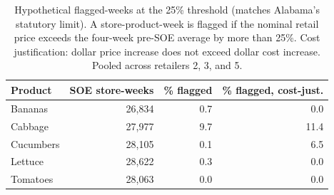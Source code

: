 \begin{table}[!h]
\centering
\caption{\label{tab:tab:flagged_weeks_T25}Hypothetical flagged-weeks at the 25\% threshold (matches Alabama's statutory limit). A store-product-week is flagged if the nominal retail price exceeds the four-week pre-SOE average by more than 25\%. Cost justification: dollar price increase does not exceed dollar cost increase. Pooled across retailers 2, 3, and 5.}
\centering
\begin{tabular}[t]{lrrr}
\toprule
Product & SOE store-weeks & \% flagged & \% flagged, cost-just.\\
\midrule
Bananas & 26,834 & 0.7 & 0.0\\
Cabbage & 27,977 & 9.7 & 11.4\\
Cucumbers & 28,105 & 0.1 & 6.5\\
Lettuce & 28,622 & 0.3 & 0.0\\
Tomatoes & 28,063 & 0.0 & 0.0\\
\bottomrule
\end{tabular}
\end{table}
